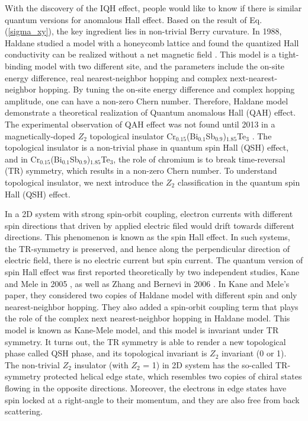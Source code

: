 With the discovery of the IQH effect, people would like to know if there is similar quantum versions for anomalous Hall effect. Based on the result of Eq. (\ref{sigma_xy}), the key ingredient lies in non-trivial Berry curvature. In 1988, Haldane studied a model with a honeycomb lattice and found the quantized Hall conductivity can be realized without a net magnetic field \cite{haldane1988model}. This model is a tight-binding model with two different site, and the parameters include the on-site energy difference, real nearest-neighbor hopping and complex next-nearest-neighbor hopping. By tuning the on-site energy difference and complex hopping amplitude, one can have a non-zero Chern number. Therefore, Haldane model demonstrate a theoretical realization of Quantum anomalous Hall (QAH) effect. The experimental observation of QAH effect was not found until 2013 in a magnetically-doped $Z_2$ topological insulator Cr$_{0.15}$(Bi$_{0.1}$Sb$_{0.9}$)$_{1.85}$Te$_3$ \cite{chang2013experimental}. The topological insulator is a non-trivial phase in quantum spin Hall (QSH) effect, and in Cr$_{0.15}$(Bi$_{0.1}$Sb$_{0.9}$)$_{1.85}$Te$_3$,
the role of chromium is to break time-reversal (TR) symmetry,  which results in a non-zero Chern number. To understand topological insulator, we next introduce the $Z_2$ classification in the quantum spin Hall (QSH) effect.

In a 2D system with strong spin-orbit coupling, electron currents with different spin directions that driven by applied electric filed would drift towards different directions. This phenomenon is known as the spin Hall effect. In such systems, the TR-symmetry is preserved, and hence along the perpendicular direction of electric field, there is no electric current but spin current. The quantum version of spin Hall effect was first reported theoretically by two independent studies, Kane and Mele in 2005 \cite{kane2005quantum}, as well as Zhang and Bernevi in 2006 \cite{bernevig2006quantum}. In Kane and Mele's paper, they considered two copies of Haldane model with different spin and only nearest-neighbor hopping. They also added a spin-orbit coupling term that plays the role of the complex next nearest-neighbor hopping in Haldane model. This model is known as Kane-Mele model, and this model is invariant under TR symmetry. It turns out, the TR symmetry is able to render a new topological phase called QSH phase, and its topological invariant is $Z_2$ invariant (0 or 1). The non-trivial $Z_2$ insulator (with $Z_2$ = 1) in 2D system has the so-called TR-symmetry protected helical edge state, which resembles two copies of chiral states flowing in the opposite directions. Moreover, the electrons in edge states have spin locked at a right-angle to their momentum, and they are also free from back scattering. 

